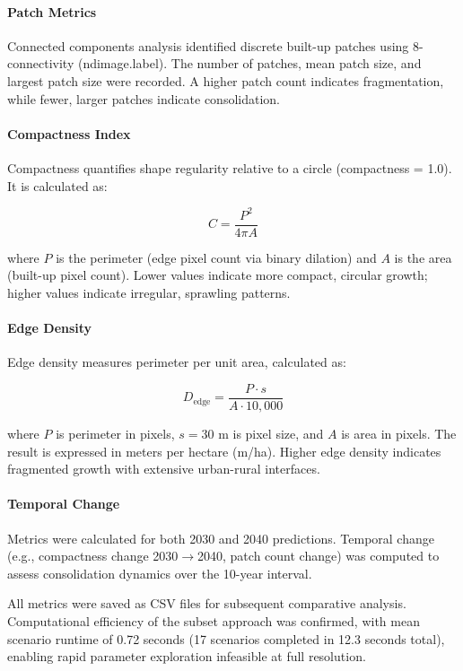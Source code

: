 \documentclass[12pt,a4paper]{article}
\begin{document}
\paragraph{Patch Metrics}
Connected components analysis identified discrete built-up patches using 8-connectivity (ndimage.label). The number of patches, mean patch size, and largest patch size were recorded. A higher patch count indicates fragmentation, while fewer, larger patches indicate consolidation.

\paragraph{Compactness Index}
Compactness quantifies shape regularity relative to a circle (compactness = 1.0). It is calculated as:

\begin{equation}
C = \frac{P^2}{4\pi A}
\label{eq:compactness}
\end{equation}

where $P$ is the perimeter (edge pixel count via binary dilation) and $A$ is the area (built-up pixel count). Lower values indicate more compact, circular growth; higher values indicate irregular, sprawling patterns.

\paragraph{Edge Density}
Edge density measures perimeter per unit area, calculated as:

\begin{equation}
D_{\text{edge}} = \frac{P \cdot s}{A \cdot 10{,}000}
\label{eq:edge_density}
\end{equation}

where $P$ is perimeter in pixels, $s = 30$ m is pixel size, and $A$ is area in pixels. The result is expressed in meters per hectare (m/ha). Higher edge density indicates fragmented growth with extensive urban-rural interfaces.

\paragraph{Temporal Change}
Metrics were calculated for both 2030 and 2040 predictions. Temporal change (e.g., compactness change 2030$\rightarrow$2040, patch count change) was computed to assess consolidation dynamics over the 10-year interval.

All metrics were saved as CSV files for subsequent comparative analysis. Computational efficiency of the subset approach was confirmed, with mean scenario runtime of 0.72 seconds (17 scenarios completed in 12.3 seconds total), enabling rapid parameter exploration infeasible at full resolution.
\end{document}
